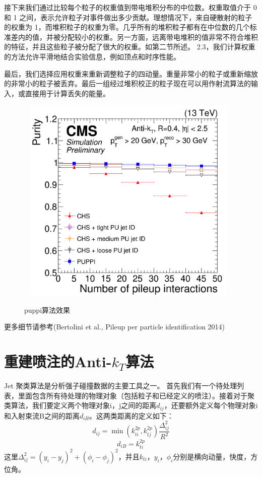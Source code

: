 接下来我们通过比较每个粒子的权重值到带电堆积分布的中位数。权重取值介于 0 和 1 之间，表示允许粒子对事件做出多少贡献。理想情况下，来自硬散射的粒子的权重为 1，而堆积粒子的权重为零。几乎所有的堆积粒子都有在中位数的几个标准差内的值，并被分配较小的权重。另一方面，远离带电堆积的值非常不符合堆积的特征，并且这些粒子被分配了很大的权重。如第二节所述。 2.3，我们计算权重的方法允许平滑地结合实验信息，例如顶点和时序性能。

最后，我们选择应用权重来重新调整粒子的四动量。重量非常小的粒子或重新缩放的非常小的粒子被丢弃。最后一组经过堆积校正的粒子现在可以用作射流算法的输入，或直接用于计算丢失的能量。



\begin{figure}[H]
 \centering
 \caption{puppi算法效果}
 \includegraphics[height=10cm, width=11cm]{pictures/puppi_performance.png}
 \label{fig2.0}
\end{figure}

更多细节请参考(Bertolini et al., Pileup per particle identification 2014)

\section{重建喷注的Anti-$k_T$算法}
Jet 聚类算法是分析强子碰撞数据的主要工具之一。
首先我们有一个待处理列表，里面包含所有待处理的物理对象（包括粒子和已经定义的喷注）。接着对于聚类算法，我们要定义两个物理对象i，j之间的距离\(d_{ij}\)，还要额外定义每个物理对象i和入射束流B之间的距离$d_{iB}$。这两类距离的定义如下：
\begin{equation}\label{eq:dij}
    d_{ij}=\min(k_{ti}^{2p},k_{tj}^{2p})\frac{\Delta_{ij}^{2}}{R^{2}}
\end{equation}
\begin{equation}\label{eq:diB}
    d_{iB}=k_{ti}^{2p}
\end{equation}
这里$\displaystyle\Delta_{ij}^{2}=(y_{i}-y_{j})^{2}+(\phi_{i}-\phi_{j})^{2}$，并且$k_{ti}$，$y_i$，$\phi_i$分别是横向动量，快度，方位角。%

